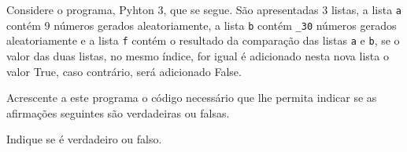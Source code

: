 \documentclass[12pt,varwidth=16cm,border=1pt]{standalone}
\begin{document}
Considere o programa, Pyhton 3, que se segue. São apresentadas 3 listas, a lista \verb+a+ contém 9 números gerados aleatoriamente, a lista \verb+b+ contém \verb+_30+ números gerados aleatoriamente e a lista \verb+f+ contém o resultado da comparação das listas \verb+a+ e \verb+b+, se o valor das duas listas, no mesmo índice, for igual é adicionado nesta nova lista o valor True, caso contrário, será adicionado False.


Acrescente a este programa o código necessário que lhe permita indicar se as
afirmações seguintes são verdadeiras ou falsas.

Indique se é verdadeiro ou falso.
\end{document}
